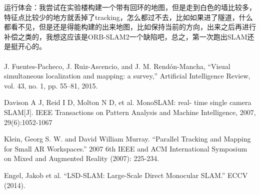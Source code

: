 \documentclass[40pt,a4paper，UTF8]{ctexart}
\begin{document}
运行体会：我尝试在实验楼构建一个带有回环的地图，但是走到白色的墙比较多，特征点比较少的地方就丢掉了tracking，怎么都过不去，比如如果进了隧道，什么都看不见，但是还是得能构建的出来地图，比如保持当前的方向，出来之后再进行补偿之类的，我想这应该是ORB-SLAM2一个缺陷吧，总之，第一次跑出SLAM还是挺开心的。


\paragraph{}

\begin{thebibliography}{99}  
J. Fuentes-Pacheco, J. Ruiz-Ascencio, and J. M. Rendón-Mancha, “Visual simultaneous localization and mapping: a survey,” Artificial Intelligence Review, vol. 43, no. 1, pp. 55–81, 2015.

Davison A J, Reid I D, Molton N D, et al. MonoSLAM: real- time single camera SLAM[J]. IEEE Transactions on Pattern Analysis and Machine Intelligence, 2007, 29(6):1052-1067

Klein, Georg S. W. and David William Murray. “Parallel Tracking and Mapping for Small AR Workspaces.” 2007 6th IEEE and ACM International Symposium on Mixed and Augmented Reality (2007): 225-234.

Engel, Jakob et al. “LSD-SLAM: Large-Scale Direct Monocular SLAM.” ECCV (2014).
\end{thebibliography}
\end{document}
